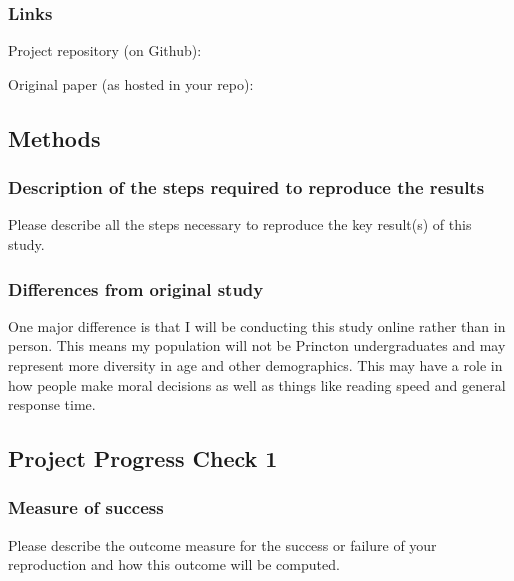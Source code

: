 \documentclass[
]{article}
\begin{document}
\hypertarget{links}{%
\subsubsection{Links}\label{links}}

Project repository (on Github):

Original paper (as hosted in your repo):

\hypertarget{methods}{%
\subsection{Methods}\label{methods}}

\hypertarget{description-of-the-steps-required-to-reproduce-the-results}{%
\subsubsection{Description of the steps required to reproduce the
results}\label{description-of-the-steps-required-to-reproduce-the-results}}

Please describe all the steps necessary to reproduce the key result(s)
of this study.

\hypertarget{differences-from-original-study}{%
\subsubsection{Differences from original
study}\label{differences-from-original-study}}

One major difference is that I will be conducting this study online
rather than in person. This means my population will not be Princton
undergraduates and may represent more diversity in age and other
demographics. This may have a role in how people make moral decisions as
well as things like reading speed and general response time.

\hypertarget{project-progress-check-1}{%
\subsection{Project Progress Check 1}\label{project-progress-check-1}}

\hypertarget{measure-of-success}{%
\subsubsection{Measure of success}\label{measure-of-success}}

Please describe the outcome measure for the success or failure of your
reproduction and how this outcome will be computed.
\end{document}
